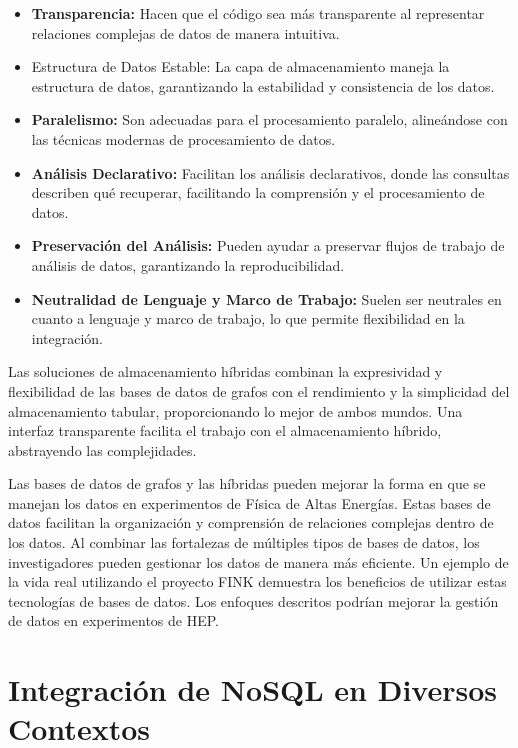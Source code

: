 \documentclass[pdflatex,sn-mathphys-num]{sn-jnl}
\theoremstyle{thmstyleone}%
\theoremstyle{thmstyletwo}%
\theoremstyle{thmstylethree}%
\begin{document}
\begin{itemize}
    \item \textbf{Transparencia:} Hacen que el código sea más transparente al representar relaciones complejas de datos de manera intuitiva.
    
    \item Estructura de Datos Estable: La capa de almacenamiento maneja la estructura de datos, garantizando la estabilidad y consistencia de los datos.
    
    \item \textbf{Paralelismo:} Son adecuadas para el procesamiento paralelo, alineándose con las técnicas modernas de procesamiento de datos.
    
    \item \textbf{Análisis Declarativo:} Facilitan los análisis declarativos, donde las consultas describen qué recuperar, facilitando la comprensión y el procesamiento de datos.
    
    \item \textbf{Preservación del Análisis:} Pueden ayudar a preservar flujos de trabajo de análisis de datos, garantizando la reproducibilidad.
    
    \item \textbf{Neutralidad de Lenguaje y Marco de Trabajo:} Suelen ser neutrales en cuanto a lenguaje y marco de trabajo, lo que permite flexibilidad en la integración.
\end{itemize}

Las soluciones de almacenamiento híbridas combinan la expresividad y flexibilidad de las bases de datos de grafos con el rendimiento y la simplicidad del almacenamiento tabular, proporcionando lo mejor de ambos mundos. Una interfaz transparente facilita el trabajo con el almacenamiento híbrido, abstrayendo las complejidades.

Las bases de datos de grafos y las híbridas pueden mejorar la forma en que se manejan los datos en experimentos de Física de Altas Energías. Estas bases de datos facilitan la organización y comprensión de relaciones complejas dentro de los datos. Al combinar las fortalezas de múltiples tipos de bases de datos, los investigadores pueden gestionar los datos de manera más eficiente. Un ejemplo de la vida real utilizando el proyecto FINK demuestra los beneficios de utilizar estas tecnologías de bases de datos. Los enfoques descritos podrían mejorar la gestión de datos en experimentos de HEP.

\section{Integración de NoSQL en Diversos Contextos}\label{sec7}
\end{document}
